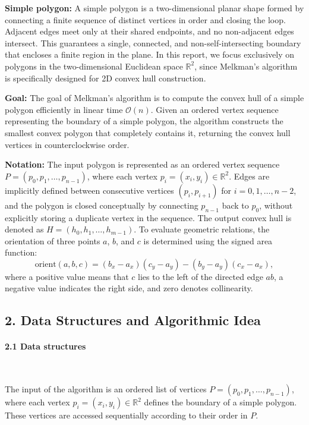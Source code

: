 \documentclass{article}
\begin{document}
\textbf{Simple polygon:} A simple polygon is a two-dimensional planar shape formed by connecting a finite sequence of distinct vertices in order and closing the loop. Adjacent edges meet only at their shared endpoints, and no non-adjacent edges intersect. This guarantees a single, connected, and non-self-intersecting boundary that encloses a finite region in the plane. In this report, we focus exclusively on polygons in the two-dimensional Euclidean space $\mathbb{R}^2$, since Melkman’s algorithm is specifically designed for 2D convex hull construction.

\textbf{Goal:} The goal of Melkman’s algorithm is to compute the convex hull of a simple polygon efficiently in linear time $\mathcal{O}(n)$. 
Given an ordered vertex sequence representing the boundary of a simple polygon, the algorithm constructs the smallest convex polygon that completely contains it, returning the convex hull vertices in counterclockwise order.

\textbf{Notation:} The input polygon is represented as an ordered vertex sequence $P = (p_0, p_1, \dots, p_{n-1})$, where each vertex $p_i = (x_i, y_i) \in \mathbb{R}^2$. 
Edges are implicitly defined between consecutive vertices $(p_i, p_{i+1})$ for $i = 0, 1, \dots, n-2$, and the polygon is closed conceptually by connecting $p_{n-1}$ back to $p_0$, without explicitly storing a duplicate vertex in the sequence. 
The output convex hull is denoted as $H = (h_0, h_1, \dots, h_{m-1})$. 
To evaluate geometric relations, the orientation of three points $a$, $b$, and $c$ is determined using the signed area function:
\[
\text{orient}(a,b,c) = (b_x - a_x)(c_y - a_y) - (b_y - a_y)(c_x - a_x),
\]
where a positive value means that $c$ lies to the left of the directed edge $ab$, a negative value indicates the right side, and zero denotes collinearity.

\subsection*{2. Data Structures and Algorithmic Idea}

\paragraph{2.1 Data structures}\

The input of the algorithm is an ordered list of vertices $P = (p_0, p_1, \dots, p_{n-1})$, where each vertex $p_i = (x_i, y_i) \in \mathbb{R}^2$ defines the boundary of a simple polygon. 
These vertices are accessed sequentially according to their order in $P$.
\end{document}
